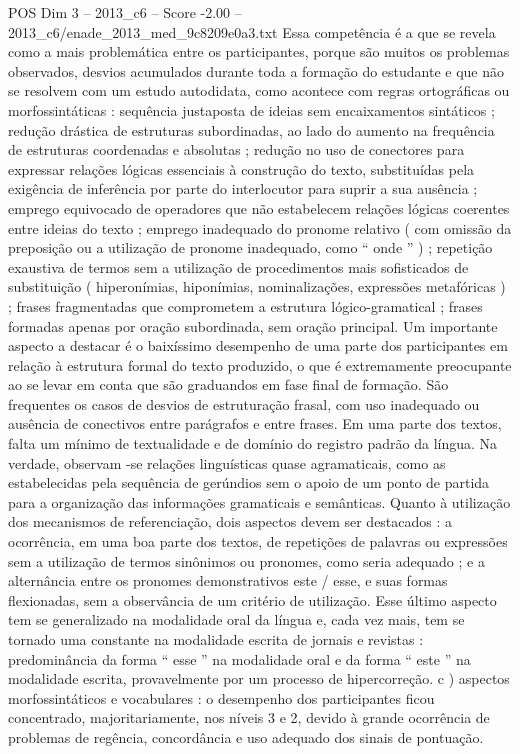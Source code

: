 \begin{textsample}{POS Dim 3 – 2013\_c6 – Score -2.00 – 2013\_c6/enade\_2013\_med\_9c8209e0a3.txt}
Essa competência é a que se revela como a mais problemática entre os participantes, porque são muitos os problemas observados, desvios acumulados durante toda a formação do estudante e que não se resolvem com um estudo autodidata, como acontece com regras ortográficas ou morfossintáticas : sequência justaposta de ideias sem encaixamentos sintáticos ; redução drástica de estruturas subordinadas, ao lado do aumento na frequência de estruturas coordenadas e absolutas ; redução no uso de conectores para expressar relações lógicas essenciais à construção do texto, substituídas pela exigência de inferência por parte do interlocutor para suprir a sua ausência ; emprego equivocado de operadores que não estabelecem relações lógicas coerentes entre ideias do texto ; emprego inadequado do pronome relativo ( com omissão da preposição ou a utilização de pronome inadequado, como “ onde ” ) ; repetição exaustiva de termos sem a utilização de procedimentos mais sofisticados de substituição ( hiperonímias, hiponímias, nominalizações, expressões metafóricas ) ; frases fragmentadas que comprometem a estrutura lógico-gramatical ; frases formadas apenas por oração subordinada, sem oração principal.
Um importante aspecto a destacar é o baixíssimo desempenho de uma parte dos participantes em relação à estrutura formal do texto produzido, o que é extremamente preocupante ao se levar em conta que são graduandos em fase final de formação.
São frequentes os casos de desvios de estruturação frasal, com uso inadequado ou ausência de conectivos entre parágrafos e entre frases.
Em uma parte dos textos, falta um mínimo de textualidade e de domínio do registro padrão da língua.
Na verdade, observam -se relações linguísticas quase agramaticais, como as estabelecidas pela sequência de gerúndios sem o apoio de um ponto de partida para a organização das informações gramaticais e semânticas.
Quanto à utilização dos mecanismos de referenciação, dois aspectos devem ser destacados : a ocorrência, em uma boa parte dos textos, de repetições de palavras ou expressões sem a utilização de termos sinônimos ou pronomes, como seria adequado ; e a alternância entre os pronomes demonstrativos este / esse, e suas formas flexionadas, sem a observância de um critério de utilização.
Esse último aspecto tem se generalizado na modalidade oral da língua e, cada vez mais, tem se tornado uma constante na modalidade escrita de jornais e revistas : predominância da forma “ esse ” na modalidade oral e da forma “ este ” na modalidade escrita, provavelmente por um processo de hipercorreção. c ) aspectos morfossintáticos e vocabulares : o desempenho dos participantes ficou concentrado, majoritariamente, nos níveis 3 e 2, devido à grande ocorrência de problemas de regência, concordância e uso adequado dos sinais de pontuação.

\end{textsample}
